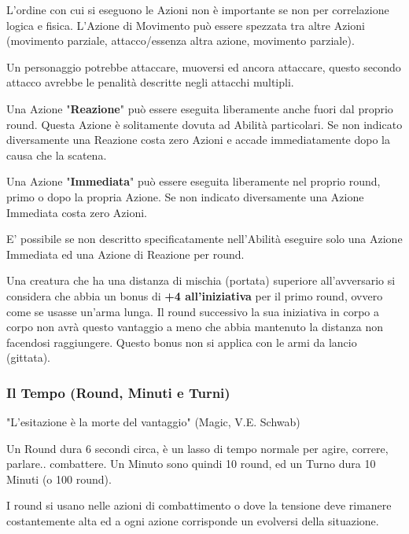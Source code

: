 \documentclass[a4paper,11pt,twoside,openany]{book}
\begin{document}
L'ordine con cui si eseguono le Azioni non è importante se non per correlazione logica e fisica. L'Azione di Movimento può essere spezzata tra altre Azioni (movimento parziale, attacco/essenza altra azione, movimento parziale).

Un personaggio potrebbe attaccare, muoversi ed ancora attaccare, questo secondo attacco avrebbe le penalità descritte negli attacchi multipli.
\smallskip

Una Azione "\textbf{Reazione}" può essere eseguita liberamente anche fuori dal proprio round. Questa Azione è solitamente dovuta ad Abilità particolari. Se non indicato diversamente una Reazione costa zero Azioni e accade immediatamente dopo la causa che la scatena.

\smallskip

Una Azione "\textbf{Immediata}" può essere eseguita liberamente nel proprio round, primo o dopo la propria Azione. Se non indicato diversamente una Azione Immediata costa zero Azioni.

E' possibile se non descritto specificatamente nell'Abilità eseguire solo una Azione Immediata ed una Azione di Reazione per round.

Una creatura che ha una distanza di mischia (portata) superiore all'avversario si considera che abbia un bonus di \textbf{+4 all'iniziativa} per il primo round, ovvero come se usasse un'arma lunga. Il round successivo la sua iniziativa in corpo a corpo non avrà questo vantaggio a meno che abbia mantenuto la distanza non facendosi raggiungere.
Questo bonus non si applica con le armi da lancio (gittata).

\subsubsection{Il Tempo (Round, Minuti e Turni)}

\label{il-tempo-round-minuti-e-turni}
\begin{tcolorbox}[enhanced,arc=5pt,boxrule=0.3pt]{
		"L'esitazione è la morte del vantaggio" (Magic, V.E. Schwab)}\end{tcolorbox}\medskip

Un Round dura 6 secondi circa, è un lasso di tempo normale per agire, correre, parlare.. combattere. Un Minuto sono quindi 10 round, ed un Turno dura 10 Minuti (o 100 round).

I round si usano nelle azioni di combattimento o dove la tensione deve rimanere costantemente alta ed a ogni azione corrisponde un evolversi della situazione.
\end{document}
